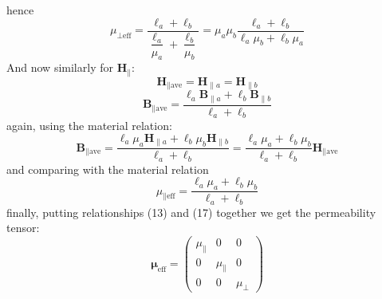 \documentclass[a4paper]{scrartcl}
\begin{document}
hence
\begin{equation}
      \mu_{\bot \textrm{eff} } = \dfrac{\ell_a + \ell_b}{ \dfrac{\ell_a}{\mu_a} + \dfrac{\ell_b}{\mu_b} } = \mu_a \mu_b \dfrac{
      \ell_a + \ell_b }{\ell_a \mu_b + \ell_b \mu_a}
\end{equation}
And now similarly for $\mathbf{H}_{\parallel}$:
\begin{equation}
      \mathbf{H}_{\parallel \textrm{ave}} = \mathbf{H}_{\parallel a} = \mathbf{H}_{\parallel b}
\end{equation}
\begin{equation}
      \mathbf{B}_{\parallel \textrm{ave} } = \dfrac{\ell_a \mathbf{B}_{\parallel a} + \ell_b \mathbf{B}_{\parallel b}}{\ell_a + \ell_b}
\end{equation}
again, using the material relation:
\begin{equation}
      \mathbf{B}_{\parallel \textrm{ave} } = \dfrac{ \ell_a \mu_a \mathbf{H}_{\parallel a} + \ell_b \mu_b \mathbf{H}_{\parallel b}
      }{\ell_a + \ell_b} = \dfrac{ \ell_a \mu_a + \ell_b \mu_b }{\ell_a + \ell_b} \mathbf{H}_{\parallel \textrm{ave} }
\end{equation}
and comparing with the material relation
\begin{equation}
      \mu_{\parallel \textrm{eff} } = \dfrac{ \ell_a \mu_a + \ell_b \mu_b }{\ell_a + \ell_b}
\end{equation}
finally, putting relationships (13) and (17) together we get the permeability tensor:
\begin{equation}
      \mathbf{\mu}_{\textrm{eff} } = \begin{pmatrix} \mu_{\parallel} & 0 & 0 \\ 0 & \mu_\parallel & 0 \\ 0 & 0 & \mu_\bot
      \end{pmatrix}
\end{equation}
\end{document}
